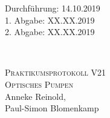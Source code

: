 



\begin{titlepage}
  \begin{flushleft}
 Durchführung: 14.10.2019\\
 1. Abgabe: XX.XX.2019\\
 2. Abgabe: XX.XX.2019
  \end{flushleft}


\HRule\\[1,0cm]

 \begin{center}


\textsc{\LARGE Praktikumsprotokoll V21}\\[1.5cm]
\textsc{\huge Optisches Pumpen} \\[5,5cm]

Anneke Reinold\footnotemark[1], \\
Paul-Simon Blomenkamp\footnotemark[2] \\[1,0cm]



 \end{center}
\HRule

 \vfill
\end{titlepage}






\printbibliography



